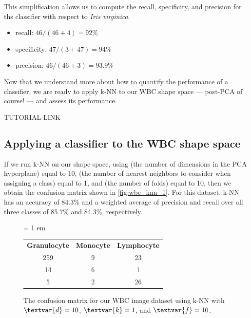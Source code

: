This simplification allows us to compute the recall, specificity, and precision for ths classifier with respect to \textit{Iris virginica}.

\begin{itemize}
\item recall: $46/(46+4) = 92\%$
\item specificity: $47/(3+47) = 94\%$
\item precision: $46/(46+3) = 93.9\%$
\end{itemize}

\begin{qbox}\end{qbox}

Now that we understand more about how to quantify the performance of a classifier, we are ready to apply k-NN to our WBC shape space --- post-PCA of course! --- and assess its performance.

TUTORIAL LINK

\FloatBarrier
{}
\subsection{Applying a classifier to the WBC shape space}

If we run k-NN on our shape space, using  (the number of dimensions in the PCA hyperplane) equal to 10,  (the number of nearest neighbors to consider when assigning a class) equal to 1, and  (the number of folds) equal to 10, then we obtain the confusion matrix shown in \autoref{fig:wbc_knn_1}. For this dataset, k-NN has an accuracy of 84.3\% and a weighted average of precision and recall over all three classes of 85.7\% and 84.3\%, respectively.\\

\begin{figure}[h]
\centering
\tabcolsep = 1 em
\mySfFamily
\begin{tabular}{c c c}
\textbf{Granulocyte} & \textbf{Monocyte} & \textbf{Lymphocyte} \\
259 & 9 & 23 \\
14 & 6 & 1 \\
5 & 2 & 26
\end{tabular}
\caption{The confusion matrix for our WBC image dataset using k-NN with $\textvar{d} = \text{10}$, $\textvar{k} = \text{1}$, and $\textvar{f} = \text{10}$.}
\label{fig:wbc_better_confusion_matrix}
\end{figure}

